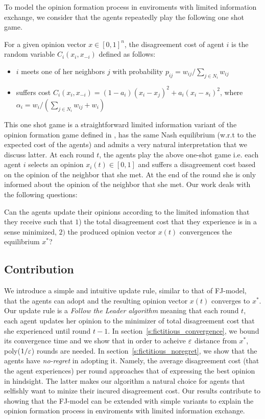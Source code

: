 To model the opinion formation process in enviroments
with limited information exchange, we consider
that the agents repeatedly play the following one shot game.

\begin{definition}\label{d:random_game}
  For a given opinion vector $x \in [0,1]^n$, the disagreement cost of agent $i$
  is the random variable $C_i(x_i,x_{-i})$ defined as follows:
  \begin{itemize}
    \item $i$ meets one of her neighbors $j$ with probability
      $p_{ij}= w_{ij}/\sum_{j\in N_i}w_{ij}$
    \item suffers cost $C_i(x_i , x_{-i}) = (1-a_i)(x_i-x_j)^2 + a_i(x_i-s_i)^2$,
      where $\alpha_i = w_i/(\sum_{j\in N_i}w_{ij}+w_i)$
  \end{itemize}
\end{definition}

This one shot game
is a straightforward limited information variant of the opinion formation game
defined in \cite{BKO11}, has the same Nash equilibrium (w.r.t
to the expected cost of the agents) and admits a very
natural interpretation that we discuss latter.
At each round $t$, the agents play the above one-shot game i.e.
each agent $i$ selects an opinion $x_i(t)\in [0,1]$ and
suffers a disagreement cost based on the opinion of the neighbor
that she met. At the end of the round she is only informed about
the opinion of the neighbor that she met. Our work
deals with the following questions:
\begin{question}
Can the agents update their opinions according to the
limited infomation that they receive such that
$1$) the total disagreement cost that they experience is in a
sense minimized, $2)$ the produced opinion vector $x(t)$ convergences
the equilibrium $x^*$?
\end{question}

\subsection{Contribution}
We introduce a simple and intuitive update rule,
similar to that of FJ-model, that the agents can adopt
and the resulting opinion vector $x(t)$ converges to $x^*$.
Our update rule is a \emph{Follow the Leader algorithm}
meaning that each round $t$, each agent updates her opinion
to the minimizer of total disagreement cost that
she experienced until round $t-1$. In section~\ref{s:fictitious_convergence},
we bound its convergence time and we show that in order
to acheive $\varepsilon$ distance from $x^*$, poly($1/\varepsilon$) rounds
are needed. In section~\ref{s:fictitious_noregret},
we show that the agents have \emph{no-regret} in adopting
it. Namely, the average disagreement cost (that
the agent experiences) per round approaches that
of expressing the best opinion in hindsight. The latter
makes our algorithm a natural choice for agents that
selfishly want to minize their incured disagreement cost.
Our results contribute to showing that the FJ-model
can be extended with simple variants to explain
the opinion formation process in enviroments with limited
information exchange.

